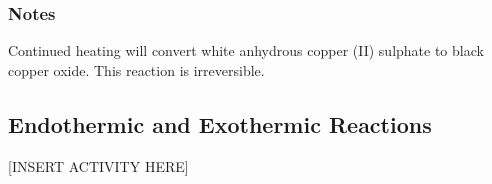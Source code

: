 \subsubsection*{Notes}
Continued heating will convert white anhydrous copper (II) sulphate to black copper oxide. This reaction is irreversible.

\subsection{Endothermic and Exothermic Reactions}

[INSERT ACTIVITY HERE]
